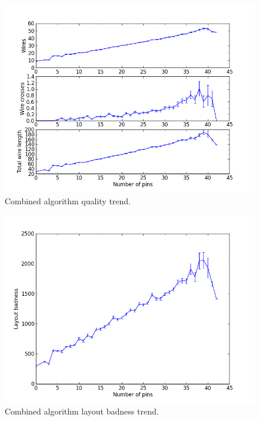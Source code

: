 \begin{figure}[H]
\begin{center}
\includegraphics[width=\textwidth]{Images/final_algorithm_quality_trend.png}
\caption{Combined algorithm quality trend.}
\label{fig:final_quality_trend}
\end{center}
\end{figure}

\begin{figure}[H]
\begin{center}
\includegraphics[width=\textwidth]{Images/final_algorithm_badness_trend.png}
\caption{Combined algorithm layout badness trend.}
\label{fig:final_badness_trend}
\end{center}
\end{figure}

